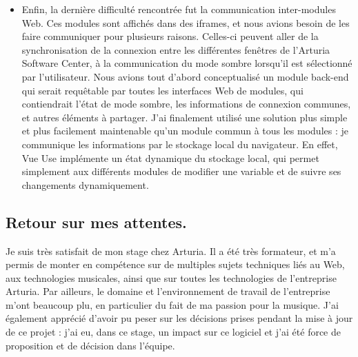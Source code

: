 \documentclass[francais]{rapportPFE}  %
\begin{document}
\begin{itemize}
    \item Enfin, la dernière difficulté rencontrée fut la communication inter-modules Web. Ces modules sont affichés dans des iframes, et nous avions besoin de les faire communiquer pour plusieurs raisons. Celles-ci peuvent aller de la synchronisation de la connexion entre les différentes fenêtres de l'Arturia Software Center, à la communication du mode sombre lorsqu'il est sélectionné par l'utilisateur. Nous avions tout d'abord conceptualisé un module back-end qui serait requêtable par toutes les interfaces Web de modules, qui contiendrait l'état de mode sombre, les informations de connexion communes, et autres éléments à partager. J'ai finalement utilisé une solution plus simple et plus facilement maintenable qu'un module commun à tous les modules : je communique les informations par le stockage local du navigateur. En effet, Vue Use implémente un état dynamique du stockage local, qui permet simplement aux différents modules de modifier une variable et de suivre ses changements dynamiquement.
\end{itemize}
% 

\subsection{Retour sur mes attentes.}
Je suis très satisfait de mon stage chez Arturia. Il a été très formateur, et m'a permis de monter en compétence sur de multiples sujets techniques liés au Web, aux technologies musicales, ainsi que sur toutes les technologies de l'entreprise Arturia.
Par ailleurs, le domaine et l'environnement de travail de l'entreprise m'ont beaucoup plu, en particulier du fait de ma passion pour la musique.
J'ai également apprécié d'avoir pu peser sur les décisions prises pendant la mise à jour de ce projet : j'ai eu, dans ce stage, un impact sur ce logiciel et j'ai été force de proposition et de décision dans l'équipe. 



\end{document}
